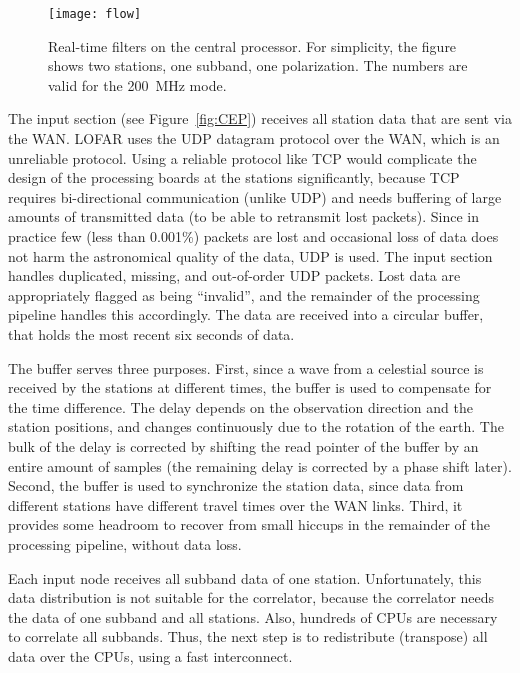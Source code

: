 \documentclass[journal]{IEEEtran}
\begin{document}
\begin{figure}
\texttt{[image: flow]}
\caption{Real-time filters on the central processor.  For simplicity, the
figure shows two stations, one subband, one polarization.  The numbers are
valid for the 200~MHz mode.}
\label{fig:flow}
\end{figure}

The input section (see Figure~\ref{fig:CEP}) receives all station data that
are sent via the WAN.
LOFAR uses the UDP datagram protocol over the WAN, which is an unreliable
protocol.
Using a reliable protocol like TCP would complicate the design of the
processing boards at the stations significantly, because TCP requires
bi-directional communication (unlike UDP) and needs buffering of large amounts
of transmitted data (to be able to retransmit lost packets).
Since in practice few (less than 0.001\%) packets are lost and occasional loss
of data does not harm the astronomical quality of the data, UDP is used.
The input section handles duplicated, missing, and out-of-order UDP packets.
Lost data are appropriately flagged as being ``invalid'', and the remainder
of the processing pipeline handles this accordingly.
The data are received into a circular buffer, that holds the most recent
six seconds of data.

The buffer serves three purposes.
First, since a wave from a celestial source is received by the stations at
different times, the buffer is used to compensate for the time difference.
The delay depends on the observation direction and the station positions,
and changes continuously due to the rotation of the earth.
The bulk of the delay is corrected by shifting the read pointer of the buffer
by an entire amount of samples (the remaining delay is corrected by a phase
shift later).
Second, the buffer is used to synchronize the station data, since data from
different stations have different travel times over the WAN links.
Third, it provides some headroom to recover from small hiccups in the
remainder of the processing pipeline, without data loss.

Each input node receives all subband data of one station.
Unfortunately, this data distribution is not suitable for the correlator,
because the correlator needs the data of one subband and all stations.
Also, hundreds of CPUs are necessary to correlate all subbands.
Thus, the next step is to redistribute (transpose) all data over the CPUs,
using a fast interconnect.
\end{document}
